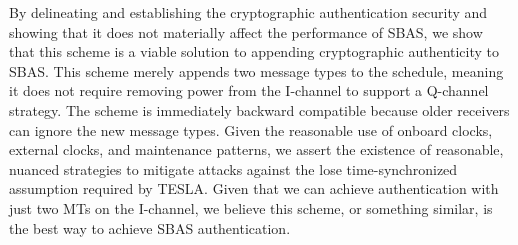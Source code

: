 \documentclass[letterpaper,times]{IONconf/IONconf}
\begin{document}
	By delineating and establishing the cryptographic authentication security and showing that it does not materially affect the performance of SBAS, we show that this scheme is a viable solution to appending cryptographic authenticity to SBAS.
	This scheme merely appends two message types to the schedule, meaning it does not require removing power from the I-channel to support a Q-channel strategy.
	The scheme is immediately backward compatible because older receivers can ignore the new message types.
	Given the reasonable use of onboard clocks, external clocks, and maintenance patterns, we assert the existence of reasonable, nuanced strategies to mitigate attacks against the lose time-synchronized assumption required by TESLA.
	Given that we can achieve authentication with just two MTs on the I-channel, we believe this scheme, or something similar, is the best way to achieve SBAS authentication.



\end{document}
